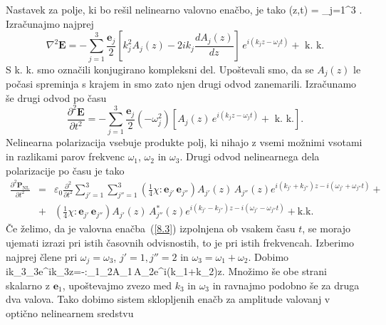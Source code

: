 \documentclass[11pt,fleqn]{book} %
\begin{document}
Nastavek za polje, ki bo rešil nelinearno valovno enačbo, je tako
\beq
{}(z,t) = \sum_{j=1}^3 .
\label{eq:nlnastavek}
\eeq
Izračunajmo najprej 
\begin{equation}
\nabla^{2}\mathbf{E}=-\sum_{j=1}^3 \frac{\mathbf{e}_{j}}{2}\left[k_{j}^{2}A_{j}(z)-2ik_{j}
\frac{dA_{j}(z)}{dz}\right]\, e^{i(k_{j}z-\omega_{j}t)}+\mbox{ k. k.}
\label{8.5}
\end{equation}
S k. k. smo označili konjugirano kompleksni del. Upoštevali smo,
da se $A_{j}(z)$ le počasi spreminja s krajem in smo zato njen
drugi odvod zanemarili.
Izračunamo še drugi odvod po času 
\begin{equation}
\frac{\partial^2\mathbf{E}}{\partial t^2}=-\sum_{j=1}^3 \frac{\mathbf{e}_{j}}{2}
\left(-\omega_j^2\right) \left[A_{j}(z)\, e^{i(k_{j}z-\omega_{j}t)}+\mbox{ k. k.}\right].
\label{8.5a}
\end{equation}
Nelinearna polarizacija vsebuje produkte polj, ki nihajo z vsemi možnimi
vsotami in razlikami parov frekvenc $\omega_{1}$, $\omega_{2}$ in
$\omega_{3}$. Drugi odvod nelinearnega dela polarizacije po času je tako
\begin{eqnarray}
\frac{\partial^2\mathbf{P}_\mathrm{NL}}{\partial t^2}&=&\varepsilon_0 \frac{\partial^2}
{\partial t^2}\sum_{j'=1}^3 \sum_{j''=1}^3 
 \left( \frac{1}{4} \chi:\mathbf{e}_{j'}\,\mathbf{e}_{j''}\right) 
 A_{j'}(z)\,A_{j''}(z) e^{i(k_{j'}+k_{j''})z-i(\omega_{j'}+\omega_{j''}t)}+ \nonumber\\
&+& \left( \frac{1}{4} \chi:\mathbf{e}_{j'}\,\mathbf{e}_{j''}\right)
A_{j'}(z)\,A_{j''}^*(z) e^{i(k_{j'}-k_{j''})z-i(\omega_{j'}-\omega_{j''}t)}+ \mathrm{k. k.}
\label{8.5b}
\end{eqnarray}
Če želimo, da je valovna enačba~(\ref{8.3}) izpolnjena ob vsakem času $t$, se morajo
ujemati izrazi pri istih časovnih odvisnostih, to je pri istih frekvencah. Izberimo
najprej člene pri $\omega_j = \omega_3$, $j'=1, j''=2$ in $\omega_3 = \omega_1 + \omega_2$. Dobimo
\beq
ik_{3}_{3}e^{ik_{3}z}=-\chi:_{1}_{2}A_{1}\,A_{2}e^{i(k_{1}+k_{2})z}.
\label{8.7}
\eeq
Množimo še obe strani skalarno z $\mathbf{e}_{1}$, upoštevajmo zvezo med $k_{3}$ in $\omega_{3}$ in 
ravnajmo podobno še za druga dva valova. Tako dobimo sistem sklopljenih
enačb za amplitude valovanj v optično nelinearnem sredstvu
\end{document}
